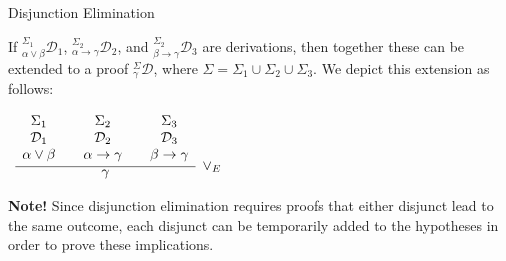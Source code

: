 \documentclass{book}
\begin{document}
    {Disjunction Elimination}

        If $^{\Sigma_{1}}_{\alpha\lor\beta}\mathcal{D}_{1}$, $^{\Sigma_{2}}_{\alpha\rightarrow\gamma}\mathcal{D}_{2}$, and $^{\Sigma_{2}}_{\beta\rightarrow\gamma}\mathcal{D}_{3}$ are derivations, then together these can be extended to a proof $^{\Sigma}_{\gamma}\mathcal{D}$, where $\Sigma = \Sigma_{1} \cup \Sigma_{2} \cup \Sigma_{3}$. We depict this extension as follows: 

        \begin{center}
            $\begin{array}{ c }
	
                \infer[\lor_{E}]{\gamma}
                    {
                    \begin{array}{c} \Sigma_{1}  \\ \mathcal{D}_{1} \\ \alpha\lor\beta \end{array}
                     & 
                    \begin{array}{c} \Sigma_{2}  \\ \mathcal{D}_{2} \\ \alpha\rightarrow\gamma \end{array}				
                     & 
                    \begin{array}{c} \Sigma_{3}  \\ \mathcal{D}_{3} \\ \beta\rightarrow\gamma \end{array}				 
                    }	
            
            \end{array}$            
        \end{center}
    

    {\bf Note!} Since disjunction elimination requires proofs that either disjunct lead to the same outcome, each disjunct can be temporarily added to the hypotheses in order to prove these implications. 
\end{document}
